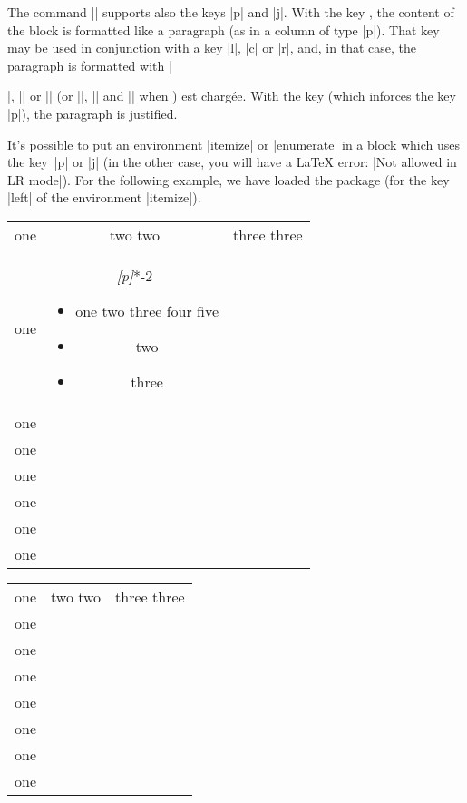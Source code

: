 \documentclass[dvipsnames]{article}%
\begin{document}
\bigskip
The command |\Block| supports also the keys |p| and |j|. With the key
, the content of the block is formatted like a paragraph (as in a
column of type |p|). That key may be used in conjunction with a key |l|, |c|
or |r|, and, in that case, the paragraph is formatted with |\raggedright|,
|\centering| or |\raggedleft| (or |\RaggedRight|, |\Centering| and |\RaggedLeft|
when ) est chargée. With the key  (which inforces
the key |p|), the paragraph is justified.

\bigskip
It's possible to put an environment |{itemize}| or |{enumerate}| in a block
which uses the key~|p| or |j| (in the other case, you will have a LaTeX error:
|Not allowed in LR mode|). For the following example, we have loaded the package
 (for the key |left| of the environment |{itemize}|).

\begin{Code}
\begin{NiceTabular}[hvlines]{ccc}
one & two two & three three \\
one & 
\Block\emph{[p]}{*-2}{%
\begin{itemize}[left=0pt]
\item one two three four five 
\item two 
\item three
\end{itemize}
} \\
one & \\
one & \\
one & \\
one & \\
one & \\
one & \\
\end{NiceTabular}
\end{Code}


\begin{center}
\begin{NiceTabular}[hvlines]{ccc}
one & two two & three three \\
one & 
 \\
one & \\
one & \\
one & \\
one & \\
one & \\
one & \\
\end{NiceTabular}
\end{center}
\end{document}
